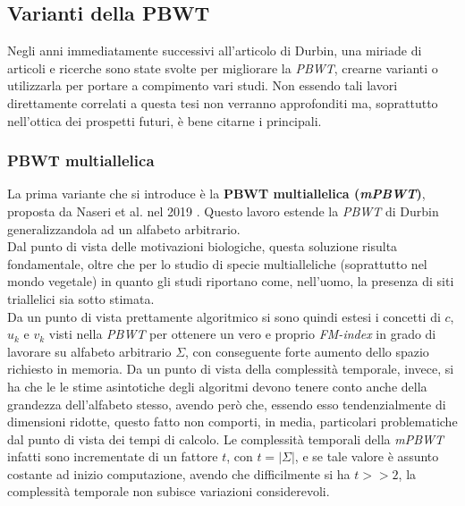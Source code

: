 \subsection{Varianti della PBWT}
Negli anni immediatamente successivi all'articolo di Durbin, una miriade di
articoli e ricerche sono state svolte per migliorare la \textit{PBWT}, crearne
varianti o utilizzarla per portare a compimento vari studi. Non essendo tali
lavori direttamente correlati a questa tesi non 
verranno approfonditi ma, soprattutto nell'ottica dei prospetti futuri, è bene
citarne i principali.
\subsubsection{PBWT multiallelica}
La prima variante che si introduce è la \textbf{PBWT multiallelica
  (\textit{mPBWT})}, proposta da Naseri et al. nel 2019 \cite{mpbwt}. Questo
lavoro estende la \textit{PBWT} di Durbin generalizzandola ad un alfabeto
arbitrario. \\
Dal punto di vista delle motivazioni biologiche, questa soluzione risulta
fondamentale, oltre che per lo studio di specie multialleliche (soprattutto nel
mondo vegetale) in quanto gli studi riportano come, nell'uomo, la presenza di
siti triallelici sia sotto stimata. \\
Da un punto di vista prettamente algoritmico si sono quindi estesi i concetti di
$c$, $u_k$ e $v_k$ visti nella \textit{PBWT} per ottenere un vero e proprio
\textit{FM-index} in grado di lavorare su alfabeto arbitrario $\Sigma$, con
conseguente forte aumento dello spazio richiesto in memoria. Da un punto di
vista della complessità temporale, invece, si ha che le le stime asintotiche
degli 
algoritmi devono tenere conto anche della grandezza dell'alfabeto stesso, avendo
però che, essendo esso tendenzialmente di dimensioni ridotte, questo fatto non
comporti, in media, particolari problematiche dal punto di vista dei tempi di
calcolo. Le complessità temporali della \textit{mPBWT} infatti sono incrementate
di un fattore $t$, con $t=\left|\Sigma\right|$, e se tale valore è assunto
costante ad inizio computazione, avendo che difficilmente si ha $t>>2$, la
complessità temporale non subisce variazioni considerevoli.
